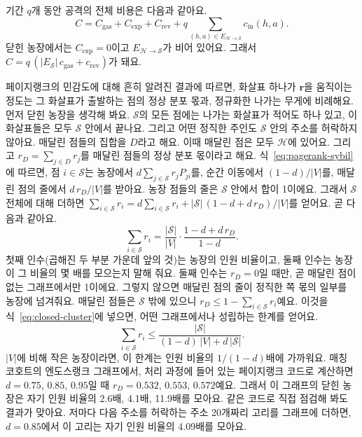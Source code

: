 기간 $q$개 동안 공격의 전체 비용은 다음과 같아요.
\begin{equation}
\label{eq:total-cost}
C = C_{\mathrm{gas}} + C_{\mathrm{exp}} + C_{\mathrm{rev}} + q\sum_{(h,a)\in E_{\mathcal{H}\to\mathcal{S}}} c_{\mathrm{in}}(h,a).
\end{equation}
닫힌 농장에서는 $C_{\mathrm{exp}}=0$이고 $E_{\mathcal{H}\to\mathcal{S}}$가 비어 있어요. 그래서 $C=q\,(|E_{\mathcal{S}}|\,c_{\mathrm{gas}}+c_{\mathrm{rev}})$가 돼요.


페이지랭크의 민감도에 대해 흔히 알려진 결과에 따르면, 화살표 하나가 $\mathbf{r}$을 움직이는 정도는 그 화살표가 출발하는 점의 정상 분포 몫과, 정규화한 나가는 무게에 비례해요. 먼저 닫힌 농장을 생각해 봐요. $\mathcal{S}$의 모든 점에는 나가는 화살표가 적어도 하나 있고, 이 화살표들은 모두 $\mathcal{S}$ 안에서 끝나요. 그리고 어떤 정직한 주인도 $\mathcal{S}$ 안의 주소를 허락하지 않아요. 매달린 점들의 집합을 $D$라고 해요. 이때 매달린 점은 모두 $\mathcal{H}$에 있어요. 그리고 $r_D=\sum_{j\in D} r_j$를 매달린 점들의 정상 분포 몫이라고 해요. 식~\eqref{eq:pagerank-sybil}에 따르면, 점 $i\in\mathcal{S}$는 농장에서 $d\sum_{j\in\mathcal{S}} r_j P_{ji}$를, 순간 이동에서 $(1-d)/|V|$를, 매달린 점의 줄에서 $d\,r_D/|V|$를 받아요. 농장 점들의 줄은 $\mathcal{S}$ 안에서 합이 1이에요. 그래서 $\mathcal{S}$ 전체에 대해 더하면 $\sum_{i\in\mathcal{S}} r_i = d\sum_{i\in\mathcal{S}} r_i + |\mathcal{S}|\,(1-d+d\,r_D)/|V|$를 얻어요. 곧 다음과 같아요.
\begin{equation}
\label{eq:closed-cluster}
\sum_{i\in\mathcal{S}} r_i = \frac{|\mathcal{S}|}{|V|}\cdot\frac{1-d+d\,r_D}{1-d}.
\end{equation}
첫째 인수(곱해진 두 부분 가운데 앞의 것)는 농장의 인원 비율이고, 둘째 인수는 농장이 그 비율의 몇 배를 모으는지 말해 줘요. 둘째 인수는 $r_D=0$일 때만, 곧 매달린 점이 없는 그래프에서만 1이에요. 그렇지 않으면 매달린 점의 줄이 정직한 쪽 몫의 일부를 농장에 넘겨줘요. 매달린 점들은 $\mathcal{S}$ 밖에 있으니 $r_D\le 1-\sum_{i\in\mathcal{S}} r_i$예요. 이것을 식~\eqref{eq:closed-cluster}에 넣으면, 어떤 그래프에서나 성립하는 한계를 얻어요.
\begin{equation}
\label{eq:cluster-mass}
\sum_{i\in\mathcal{S}} r_i \le \frac{|\mathcal{S}|}{(1-d)\,|V| + d\,|\mathcal{S}|}.
\end{equation}
$|V|$에 비해 작은 농장이라면, 이 한계는 인원 비율의 $1/(1-d)$배에 가까워요. 매칭 코호트의 엔도스랭크 그래프에서, 처리 과정에 들어 있는 페이지랭크 코드로 계산하면 $d=0.75$, $0.85$, $0.95$일 때 $r_D=0.532$, $0.553$, $0.572$예요. 그래서 이 그래프의 닫힌 농장은 자기 인원 비율의 2.6배, 4.1배, 11.9배를 모아요. 같은 코드로 직접 점검해 봐도 결과가 맞아요. 저마다 다음 주소를 허락하는 주소 20개짜리 고리를 그래프에 더하면, $d=0.85$에서 이 고리는 자기 인원 비율의 4.09배를 모아요.

